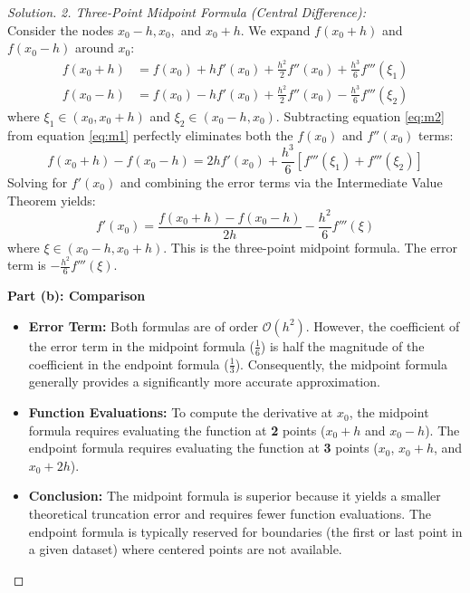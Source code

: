 \documentclass[11pt, a4paper]{article}
\newif\ifsolutionnewpage
\newenvironment{solution}
  {\begin{proof}[Solution]}
  {\end{proof}\ifsolutionnewpage\newpage\fi}
\begin{document}
\begin{solution}
\vspace{0.2cm}
\textit{2. Three-Point Midpoint Formula (Central Difference):} \\
Consider the nodes $x_0-h, x_0,$ and $x_0+h$. We expand $f(x_0+h)$ and $f(x_0-h)$ around $x_0$:
\begin{align}
f(x_0+h) &= f(x_0) + hf'(x_0) + \frac{h^2}{2}f''(x_0) + \frac{h^3}{6}f'''(\xi_1) \label{eq:m1} \\
f(x_0-h) &= f(x_0) - hf'(x_0) + \frac{h^2}{2}f''(x_0) - \frac{h^3}{6}f'''(\xi_2) \label{eq:m2}
\end{align}
where $\xi_1 \in (x_0, x_0+h)$ and $\xi_2 \in (x_0-h, x_0)$.
Subtracting equation \eqref{eq:m2} from equation \eqref{eq:m1} perfectly eliminates both the $f(x_0)$ and $f''(x_0)$ terms:
\begin{equation*}
f(x_0+h) - f(x_0-h) = 2hf'(x_0) + \frac{h^3}{6}\left[f'''(\xi_1) + f'''(\xi_2)\right]
\end{equation*}
Solving for $f'(x_0)$ and combining the error terms via the Intermediate Value Theorem yields:
\begin{equation}
f'(x_0) = \frac{f(x_0+h) - f(x_0-h)}{2h} - \frac{h^2}{6}f'''(\xi)
\end{equation}
where $\xi \in (x_0-h, x_0+h)$. This is the three-point midpoint formula. The error term is $-\frac{h^2}{6}f'''(\xi)$.

\vspace{0.5cm}
\textbf{Part (b): Comparison}

\begin{itemize}
    \item \textbf{Error Term:} Both formulas are of order $\mathcal{O}(h^2)$. However, the coefficient of the error term in the midpoint formula ($\frac{1}{6}$) is half the magnitude of the coefficient in the endpoint formula ($\frac{1}{3}$). Consequently, the midpoint formula generally provides a significantly more accurate approximation.
    \item \textbf{Function Evaluations:} To compute the derivative at $x_0$, the midpoint formula requires evaluating the function at \textbf{2} points ($x_0+h$ and $x_0-h$). The endpoint formula requires evaluating the function at \textbf{3} points ($x_0$, $x_0+h$, and $x_0+2h$).
    \item \textbf{Conclusion:} The midpoint formula is superior because it yields a smaller theoretical truncation error and requires fewer function evaluations. The endpoint formula is typically reserved for boundaries (the first or last point in a given dataset) where centered points are not available.
\end{itemize}
\end{solution}
    
\end{document}
